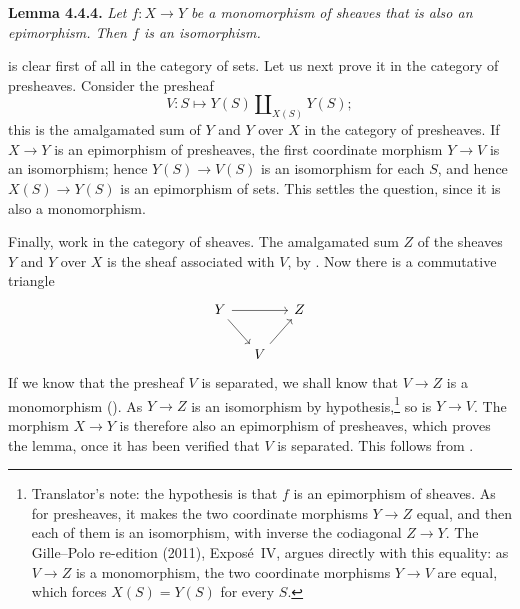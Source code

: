 \medskip
\noindent{}\textbf{Lemma 4.4.4.}
\textit{Let \(f:X\to Y\) be a monomorphism of sheaves that is also an
epimorphism. Then \(f\) is an isomorphism.}

 is clear first of all in the category of sets. Let us next prove it
in the category of presheaves. Consider the presheaf
\[
  V:S\longmapsto Y(S)\amalg_{X(S)}Y(S);
\]
this is the amalgamated sum of \(Y\) and \(Y\) over \(X\) in the category of
presheaves. If \(X\to Y\) is an epimorphism of presheaves, the first
coordinate morphism \(Y\to V\) is an isomorphism; hence \(Y(S)\to V(S)\) is
an isomorphism for each \(S\), and hence \(X(S)\to Y(S)\) is an epimorphism of
sets. This settles the question, since it is also a monomorphism.

Finally, work in the category of sheaves. The amalgamated sum \(Z\) of the
sheaves \(Y\) and \(Y\) over \(X\) is the sheaf associated with \(V\), by
. Now there is a commutative triangle
\[
\begin{tikzcd}[column sep=small]
 Y \arrow[rr] \arrow[dr] && Z\\
 & V \arrow[ur] &
\end{tikzcd}
\]
If we know that the presheaf \(V\) is separated, we shall know that
\(V\to Z\) is a monomorphism (). As \(Y\to Z\) is an
isomorphism by hypothesis,\footnote{Translator's note: the hypothesis is that \(f\) is an
epimorphism of sheaves. As for presheaves, it makes the two coordinate
morphisms \(Y\to Z\) equal, and then each of them is an isomorphism, with
inverse the codiagonal \(Z\to Y\). The Gille--Polo re-edition (2011),
Expos\'e~IV, argues directly with this equality: as \(V\to Z\) is a
monomorphism, the two coordinate morphisms \(Y\to V\) are equal, which forces
\(X(S)=Y(S)\) for every \(S\).} so is \(Y\to V\). The morphism \(X\to Y\) is
therefore also an epimorphism of presheaves, which proves the lemma, once it
has been verified that \(V\) is separated. This follows from
.
